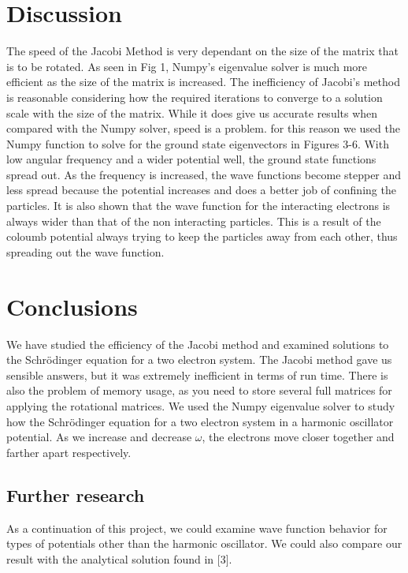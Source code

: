 \documentclass{emulateapj}
\begin{document}
\section{Discussion}
\label{sec:discussion}
The speed of the Jacobi Method is very dependant on the size of the matrix that is to be rotated. As seen in Fig 1, Numpy's eigenvalue solver is much more efficient as the size of the matrix is increased. The inefficiency of Jacobi's method is reasonable considering how the required iterations to converge to a solution scale with the size of the matrix. While it does give us accurate results when compared with the Numpy solver, speed is a problem. for this reason we used the Numpy function to solve for the ground state eigenvectors in Figures 3-6. With low angular frequency and a wider potential well, the ground state functions spread out. As the frequency is increased, the wave functions become stepper and less spread because the potential increases and does a better job of confining the particles. It is also shown that the wave function for the interacting electrons is always wider than that of the non interacting particles. This is a result of the coloumb potential always trying to keep the particles away from each other, thus spreading out the wave function.

\section{Conclusions}
\label{sec:conclusions}
We have studied the efficiency of the Jacobi method and examined solutions to the Schrödinger equation for a two electron system. The Jacobi method gave us sensible answers, but it was extremely inefficient in terms of run time. There is also the problem of memory usage, as you need to store several full matrices for applying the rotational matrices. We used the Numpy eigenvalue solver to study how the Schrödinger equation for a two electron system in a harmonic oscillator potential. As we increase and decrease $\omega$, the electrons move closer together and farther apart respectively.


\subsection{Further research}
As a continuation of this project, we could examine wave function behavior for types of potentials other than the harmonic oscillator. We could also compare our result with the analytical solution found in [3].
\end{document}
